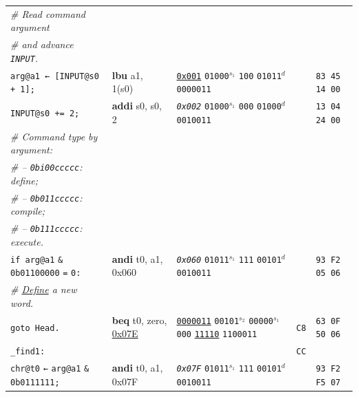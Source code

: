 \documentclass[a4paper,12pt,final]{article}
\begin{document}
\begin{table}[!htbp]
\begin{adjustwidth}{-1cm}{-1cm}
\begin{center}
\begin{tabular}{l|ll|l|l}
\hspace{1em} \emph{\# Read command argument} &  &  &  & \\[0pt]
\hspace{1em} \emph{\# and advance \texttt{INPUT}.} &  &  &  & \\[0pt]
\hspace{1em} \texttt{arg@a1 ← [INPUT@s0 + 1];} & \textbf{lbu} a1, 1(s0) & \uline{\texttt{0x001}}                    \texttt{01000}​\(^{s_{1}}\) \texttt{100} \texttt{01011}​\(^{d}\)  \texttt{0000011} &  & \texttt{83 45 14 00}\\[0pt]
\hspace{1em} \texttt{INPUT@s0 += 2;} & \textbf{addi} s0, s0, 2 & \emph{\texttt{0x002}}                    \texttt{01000}​\(^{s_{1}}\) \texttt{000} \texttt{01000}​\(^{d}\)  \texttt{0010011} &  & \texttt{13 04 24 00}\\[0pt]
\hspace{1em} \emph{\# Command type by argument:} &  &  &  & \\[0pt]
\hspace{1em} \emph{\# – \texttt{0bi00ccccc}: define;} &  &  &  & \\[0pt]
\hspace{1em} \emph{\# – \texttt{0b011ccccc}: compile;} &  &  &  & \\[0pt]
\hspace{1em} \emph{\# – \texttt{0b111ccccc}: execute.} &  &  &  & \\[0pt]
\hspace{1em} \texttt{if arg@a1} \texttt{\&} \texttt{0b01100000} \texttt{=} \texttt{0:} & \textbf{andi} t0, a1, 0x060 & \emph{\texttt{0x060}}                    \texttt{01011}​\(^{s_{1}}\) \texttt{111} \texttt{00101}​\(^{d}\)  \texttt{0010011} &  & \texttt{93 F2 05 06}\\[0pt]
\hspace{2em}     \emph{\# \uline{Define} a new word.} &  &  &  & \\[0pt]
\hspace{2em}     \texttt{goto Head.} & \textbf{beq} t0, zero, \uline{0x07E} & \uline{\texttt{0000011}} \texttt{00101}​\(^{s_{2}}\) \texttt{00000}​\(^{s_{1}}\) \texttt{000} \uline{\texttt{11110}} \texttt{1100011} & \texttt{C8} & \texttt{63 0F 50 06}\\[0pt]
\texttt{\_find1:} &  &  & \texttt{CC} & \\[0pt]
\hspace{1em} \texttt{chr@t0} \texttt{←} \texttt{arg@a1} \texttt{\&} \texttt{0b0111111;} & \textbf{andi} t0, a1, 0x07F & \emph{\texttt{0x07F}}                    \texttt{01011}​\(^{s_{1}}\) \texttt{111} \texttt{00101}​\(^{d}\)  \texttt{0010011} &  & \texttt{93 F2 F5 07}\\[0pt]

\end{tabular}
\end{center}
\end{adjustwidth}
\end{table}
\end{document}
